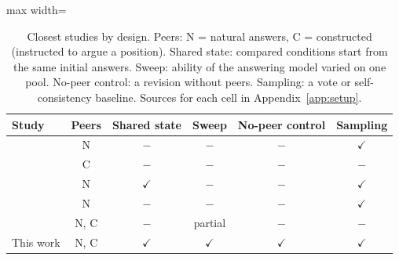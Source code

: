 \begin{table}[t]
\centering
\caption{Closest studies by design. Peers: N = natural answers, C = constructed
(instructed to argue a position). Shared state: compared conditions start from
the same initial answers. Sweep: ability of the answering model varied on one
pool. No-peer control: a revision without peers. Sampling: a vote or
self-consistency baseline. Sources for each cell in Appendix~\ref{app:setup}.}
\label{tab:relwork}
\begin{adjustbox}{max width=\linewidth}
\small
\begin{tabular}{@{}lccccc@{}}
\toprule
Study & Peers & Shared state & Sweep & No-peer control & Sampling \\
\midrule
\citet{du2023improving}           & N    & $-$          & $-$          & $-$          & $\checkmark$ \\
\citet{amayuelas2024multiagent}   & C    & $-$          & $-$          & $-$          & $-$          \\
\citet{choi2025debate}            & N    & $\checkmark$ & $-$          & $-$          & $\checkmark$ \\
\citet{zhang2025stop}             & N    & $-$          & $-$          & $-$          & $\checkmark$ \\
\citet{nilayam2026heterogeneous}  & N, C & $-$          & partial      & $-$          & $-$          \\
This work                         & N, C & $\checkmark$ & $\checkmark$ & $\checkmark$ & $\checkmark$ \\
\bottomrule
\end{tabular}
\end{adjustbox}
\end{table}
